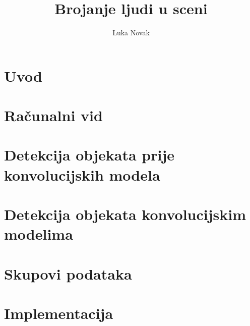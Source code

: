 \documentclass[times, utf8, diplomski]{fer}
\begin{document}

\title{Brojanje ljudi u sceni}

\author{Luka Novak}

\maketitle

\izvornik

\zahvala{}

\tableofcontents

\chapter{Uvod}


\chapter{Računalni vid}



\chapter{Detekcija objekata prije konvolucijskih modela}



\chapter{Detekcija objekata konvolucijskim modelima}



\chapter{Skupovi podataka}


\chapter{Implementacija}


\end{document}
